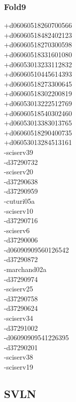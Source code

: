 \begin{multicols}{3}
\subsubsection*{Fold9}
+d06060518260700566\\
+d06060518482402123\\
+d06060518270300598\\
+d06060518331601080\\
+d06053013233112832\\
+d06060510445614393\\
+d06060518273300645\\
+d06060518302200819\\
+d06053013222512769\\
+d06060518540302460\\
+d06053013383013765\\
+d06060518290400735\\
+d06053013284513161\\
-sciserv39\\
-d37290732\\
-sciserv20\\
-d37290638\\
-d37290959\\
-cuturi05a\\
-sciserv10\\
-d37290716\\
-sciserv6\\
-d37290006\\
-d06090909560126542\\
-d37290872\\
-marchand02a\\
-d37290974\\
-sciserv25\\
-d37290758\\
-d37290624\\
-sciserv34\\
-d37291002\\
-d06090909541226395\\
-d37290201\\
-sciserv38\\
-sciserv19

\clearpage
\subsection{SVLN}
\vspace{.5cm}


\end{multicols}
